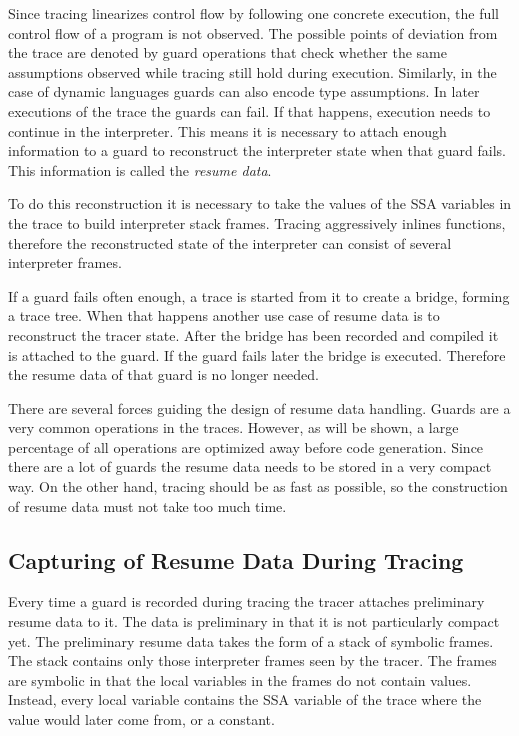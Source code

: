 \documentclass[10pt,preprint]{sigplanconf}
\begin{document}
Since tracing linearizes control flow by following one concrete execution,
the full control flow of a program is not observed.
The possible points of deviation from the trace are denoted by guard operations
that check whether the same assumptions observed while tracing
still hold during execution.
Similarly, in the case of dynamic languages guards can also encode type
assumptions.
In later executions of the trace the guards can fail.
If that happens, execution needs to continue in the interpreter.
This means it is necessary to attach enough information to a guard
to reconstruct the interpreter state when that guard fails.
This information is called the \emph{resume data}.

To do this reconstruction it is necessary to take the values of the SSA
variables in the trace to build interpreter stack frames.  Tracing
aggressively inlines functions, therefore the reconstructed state of the
interpreter can consist of several interpreter frames.

If a guard fails often enough, a trace is started from it
to create a bridge, forming a trace tree.
When that happens another use case of resume data
is to reconstruct the tracer state.
After the bridge has been recorded and compiled it is attached to the guard.
If the guard fails later the bridge is executed. Therefore the resume data of
that guard is no longer needed.

There are several forces guiding the design of resume data handling.
Guards are a very common operations in the traces.
However, as will be shown, a large percentage of all operations
are optimized away before code generation.
Since there are a lot of guards
the resume data needs to be stored in a very compact way.
On the other hand, tracing should be as fast as possible,
so the construction of resume data must not take too much time.

\subsection{Capturing of Resume Data During Tracing}
\label{sub:capturing}

Every time a guard is recorded during tracing
the tracer attaches preliminary resume data to it.
The data is preliminary in that it is not particularly compact yet.
The preliminary resume data takes the form of a stack of symbolic frames.
The stack contains only those interpreter frames seen by the tracer.
The frames are symbolic in that the local variables in the frames
do not contain values.
Instead, every local variable contains the SSA variable of the trace
where the value would later come from, or a constant.
\end{document}
